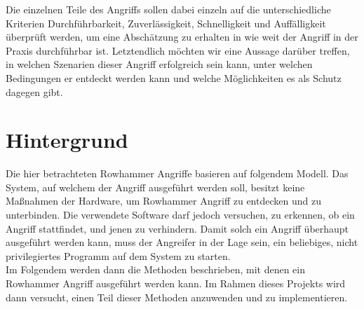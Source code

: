 \documentclass[conference]{IEEEtran}
\begin{document}
Die einzelnen Teile des Angriffs sollen dabei einzeln auf die unterschiedliche Kriterien Durchführbarkeit, Zuverlässigkeit, Schnelligkeit und Auffälligkeit überprüft werden, um eine Abschätzung zu erhalten in wie weit der Angriff in der Praxis durchführbar ist. Letztendlich möchten wir eine Aussage darüber treffen, in welchen Szenarien dieser Angriff erfolgreich sein kann, unter welchen Bedingungen er entdeckt werden kann und welche Möglichkeiten es als Schutz dagegen gibt.

\section{Hintergrund}\label{sec:background}
Die hier betrachteten Rowhammer Angriffe basieren auf folgendem Modell. Das System, auf welchem der Angriff ausgeführt werden soll, besitzt keine Maßnahmen der Hardware, um Rowhammer Angriff zu entdecken und zu unterbinden. Die verwendete Software darf jedoch versuchen, zu erkennen, ob ein Angriff stattfindet, und jenen zu verhindern. Damit solch ein Angriff überhaupt ausgeführt werden kann, muss der Angreifer in der Lage sein, ein beliebiges, nicht privilegiertes Programm auf dem System zu starten.\\
Im Folgendem werden dann die Methoden beschrieben, mit denen ein Rowhammer Angriff ausgeführt werden kann. Im Rahmen dieses Projekts wird dann versucht, einen Teil dieser Methoden anzuwenden und zu implementieren.
\end{document}
